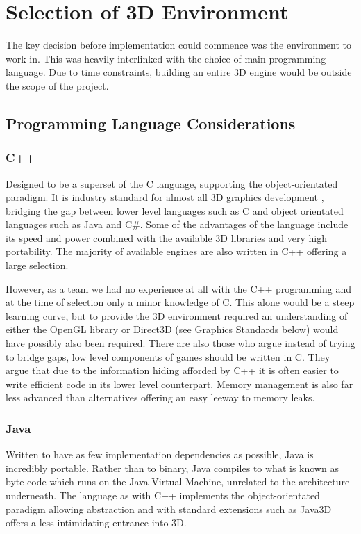 
\section{Selection of 3D Environment}

The key decision before implementation could commence was the environment
to work in. This was heavily interlinked with the choice of main
programming language. Due to time constraints, building an entire 3D
engine would be outside the scope of the project.


\subsection{Programming Language Considerations}


\subsubsection{C++}

Designed to be a superset of the C language, supporting the object-orientated
paradigm. It is industry standard for almost all 3D graphics development
\cite{Wilson2006}, bridging the gap between lower level languages
such as C and object orientated languages such as Java and C\#. Some of the advantages of the
language include its speed and power combined with the available 3D libraries and very
high portability. The majority of available engines
are also written in C++ offering a large selection.

However, as a team we had no experience at all with the C++ programming
and at the time of selection only a minor knowledge of C. This alone
would be a steep learning curve, but to provide the 3D environment
required an understanding of either the OpenGL library or Direct3D
(see Graphics Standards below) would have possibly also been required.
There are also those who argue instead of trying to bridge gaps, low
level components of games should be written in C. They argue that due to
the information hiding afforded by C++ it is often easier to write
efficient code in its lower level counterpart\cite{Wilson2006}. Memory
management is also far less advanced than alternatives offering an
easy leeway to memory leaks.

\subsubsection{Java}

Written to have as few implementation dependencies as possible, Java
is incredibly portable\cite{AboutJava}. Rather than to binary, Java
compiles to what is known as byte-code which runs on the Java Virtual
Machine, unrelated to the architecture underneath. The language as
with C++ implements the object-orientated paradigm allowing abstraction
and with standard extensions such as Java3D offers a less intimidating
entrance into 3D.

